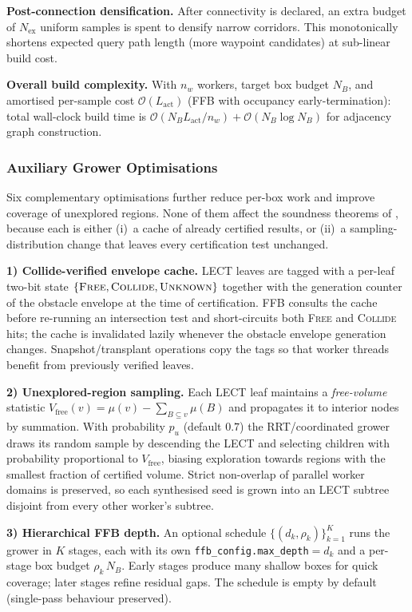 \documentclass[journal]{IEEEtran}
\begin{document}
\textbf{Post-connection densification.}
After connectivity is declared, an extra budget of $N_\text{ex}$
uniform samples is spent to densify narrow corridors. This
monotonically shortens expected query path length (more waypoint
candidates) at sub-linear build cost.

\textbf{Overall build complexity.}
With $n_w$ workers, target box budget $N_B$, and amortised per-sample
cost $\mathcal{O}(L_\text{act})$ (FFB with occupancy early-termination):
total wall-clock build time is
$\mathcal{O}(N_B L_\text{act} / n_w) + \mathcal{O}(N_B\log N_B)$
for adjacency graph construction.

\subsubsection{Auxiliary Grower Optimisations}\label{sec:grower_opts}

Six complementary optimisations further reduce per-box work and
improve coverage of unexplored regions. None of them affect the
soundness theorems of ,
because each is either (i)~a cache of already certified results, or
(ii)~a sampling-distribution change that leaves every certification
test unchanged.

\textbf{1) Collide-verified envelope cache.}
LECT leaves are tagged with a per-leaf two-bit state
$\{\textsc{Free},\textsc{Collide},\textsc{Unknown}\}$ together with the
generation counter of the obstacle envelope at the time of
certification. FFB consults the cache before re-running an
intersection test and short-circuits both \textsc{Free} and
\textsc{Collide} hits; the cache is invalidated lazily whenever the
obstacle envelope generation changes. Snapshot/transplant operations
copy the tags so that worker threads benefit from previously verified
leaves.

\textbf{2) Unexplored-region sampling.}
Each LECT leaf maintains a \emph{free-volume} statistic
$V_\text{free}(v)=\mu(v)-\sum_{B\subseteq v}\mu(B)$ and propagates it
to interior nodes by summation. With probability
$p_u$ (default $0.7$) the RRT/coordinated grower draws its random
sample by descending the LECT and selecting children with probability
proportional to $V_\text{free}$, biasing exploration towards regions
with the smallest fraction of certified volume. Strict
non-overlap of parallel worker domains is preserved, so each
synthesised seed is grown into an LECT subtree disjoint from every
other worker's subtree.

\textbf{3) Hierarchical FFB depth.}
An optional schedule
$\{(d_k,\rho_k)\}_{k=1}^{K}$ runs the grower in $K$ stages, each with
its own \texttt{ffb\_config.max\_depth}$=d_k$ and a per-stage box
budget $\rho_k\,N_B$. Early stages produce many shallow boxes for
quick coverage; later stages refine residual gaps. The schedule is
empty by default (single-pass behaviour preserved).
\end{document}
